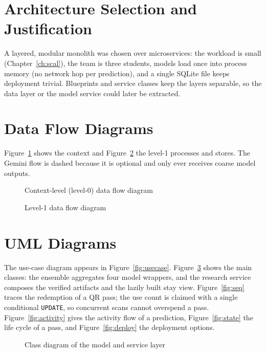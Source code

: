 \section{Architecture Selection and Justification}
A layered, modular monolith was chosen over microservices: the workload is small (Chapter~\ref{ch:scal}),
the team is three students, models load once into process memory (no network hop per prediction), and a
single SQLite file keeps deployment trivial. Blueprints and service classes keep the layers separable, so
the data layer or the model service could later be extracted.

\section{Data Flow Diagrams}
Figure~\ref{fig:dfd0} shows the context and Figure~\ref{fig:dfd1} the level-1 processes and stores. The
Gemini flow is dashed because it is optional and only ever receives coarse model outputs.

\begin{figure}[!htbp]
\centering
{}
\caption{Context-level (level-0) data flow diagram}
\label{fig:dfd0}
\end{figure}

\begin{figure}[!htbp]
\centering
{}
\caption{Level-1 data flow diagram}
\label{fig:dfd1}
\end{figure}

\section{UML Diagrams}
The use-case diagram appears in Figure~\ref{fig:usecase}. Figure~\ref{fig:class} shows the main classes:
the ensemble aggregates four model wrappers, and the research service composes the verified artifacts and
the lazily built stay view. Figure~\ref{fig:seq} traces the redemption of a QR pass; the use count is
claimed with a single conditional \texttt{UPDATE}, so concurrent scans cannot overspend a pass.
Figure~\ref{fig:activity} gives the activity flow of a prediction, Figure~\ref{fig:state} the life cycle
of a pass, and Figure~\ref{fig:deploy} the deployment options.

\begin{figure}[!htbp]
\centering
{}
\caption{Class diagram of the model and service layer}
\label{fig:class}
\end{figure}

